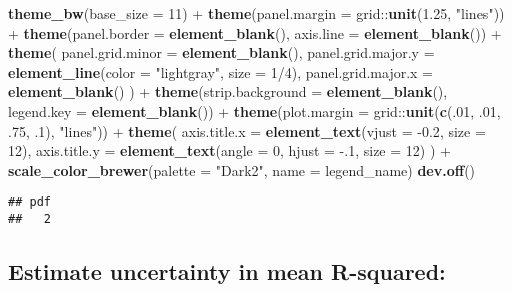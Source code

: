 \documentclass[11pt,]{article}
\newenvironment{Shaded}{\begin{snugshade}}{\end{snugshade}}
\newcommand{\KeywordTok}[1]{\textcolor[rgb]{0.13,0.29,0.53}{\textbf{{#1}}}}
\newcommand{\DataTypeTok}[1]{\textcolor[rgb]{0.13,0.29,0.53}{{#1}}}
\newcommand{\DecValTok}[1]{\textcolor[rgb]{0.00,0.00,0.81}{{#1}}}
\newcommand{\FloatTok}[1]{\textcolor[rgb]{0.00,0.00,0.81}{{#1}}}
\newcommand{\StringTok}[1]{\textcolor[rgb]{0.31,0.60,0.02}{{#1}}}
\newcommand{\NormalTok}[1]{{#1}}
\begin{document}
\begin{Shaded}
\begin{Highlighting}[]
\StringTok{  }\KeywordTok{theme_bw}\NormalTok{(}\DataTypeTok{base_size =} \DecValTok{11}\NormalTok{) +}\StringTok{ }
\StringTok{  }\KeywordTok{theme}\NormalTok{(}\DataTypeTok{panel.margin =} \NormalTok{grid::}\KeywordTok{unit}\NormalTok{(}\FloatTok{1.25}\NormalTok{, }\StringTok{"lines"}\NormalTok{)) +}\StringTok{ }
\StringTok{  }\KeywordTok{theme}\NormalTok{(}\DataTypeTok{panel.border =} \KeywordTok{element_blank}\NormalTok{(), }\DataTypeTok{axis.line =} \KeywordTok{element_blank}\NormalTok{()) +}\StringTok{ }
\StringTok{  }\KeywordTok{theme}\NormalTok{(}
    \DataTypeTok{panel.grid.minor =} \KeywordTok{element_blank}\NormalTok{(), }
    \DataTypeTok{panel.grid.major.y =} \KeywordTok{element_line}\NormalTok{(}\DataTypeTok{color =} \StringTok{"lightgray"}\NormalTok{, }\DataTypeTok{size =} \DecValTok{1}\NormalTok{/}\DecValTok{4}\NormalTok{), }
    \DataTypeTok{panel.grid.major.x =} \KeywordTok{element_blank}\NormalTok{()}
  \NormalTok{) +}\StringTok{ }
\StringTok{  }\KeywordTok{theme}\NormalTok{(}\DataTypeTok{strip.background =} \KeywordTok{element_blank}\NormalTok{(), }\DataTypeTok{legend.key =} \KeywordTok{element_blank}\NormalTok{()) +}\StringTok{ }
\StringTok{  }\KeywordTok{theme}\NormalTok{(}\DataTypeTok{plot.margin =} \NormalTok{grid::}\KeywordTok{unit}\NormalTok{(}\KeywordTok{c}\NormalTok{(.}\DecValTok{01}\NormalTok{, .}\DecValTok{01}\NormalTok{, .}\DecValTok{75}\NormalTok{, .}\DecValTok{1}\NormalTok{), }\StringTok{"lines"}\NormalTok{)) +}\StringTok{ }
\StringTok{  }\KeywordTok{theme}\NormalTok{(}
    \DataTypeTok{axis.title.x =} \KeywordTok{element_text}\NormalTok{(}\DataTypeTok{vjust =} \NormalTok{-}\FloatTok{0.2}\NormalTok{, }\DataTypeTok{size =} \DecValTok{12}\NormalTok{), }
    \DataTypeTok{axis.title.y =} \KeywordTok{element_text}\NormalTok{(}\DataTypeTok{angle =} \DecValTok{0}\NormalTok{, }\DataTypeTok{hjust =} \NormalTok{-.}\DecValTok{1}\NormalTok{, }\DataTypeTok{size =} \DecValTok{12}\NormalTok{)}
  \NormalTok{) +}\StringTok{ }
\StringTok{  }\KeywordTok{scale_color_brewer}\NormalTok{(}\DataTypeTok{palette =} \StringTok{"Dark2"}\NormalTok{, }\DataTypeTok{name =} \NormalTok{legend_name)}
\KeywordTok{dev.off}\NormalTok{()}
\end{Highlighting}
\end{Shaded}

\begin{verbatim}
## pdf 
##   2
\end{verbatim}

\subsection{Estimate uncertainty in mean
R-squared:}\label{estimate-uncertainty-in-mean-r-squared}
\end{document}
